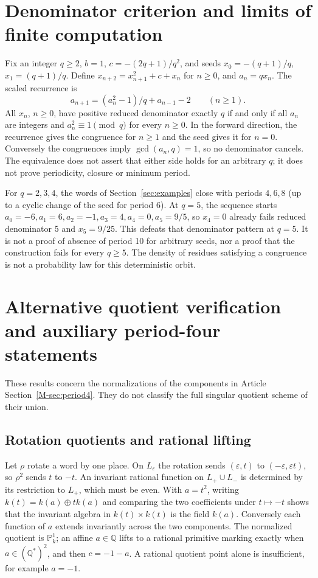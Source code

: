 \documentclass{jT}
\newcommand{\Q}{\mathbb Q}
\newcommand{\PP}{\mathbb P}
\begin{document}
\section{Denominator criterion and limits of finite computation}\label{app:denom}
Fix an integer $q\ge2$, $b=1$, $c=-(2q+1)/q^2$, and seeds $x_0=-(q+1)/q$, $x_1=(q+1)/q$. Define $x_{n+2}=x_{n+1}^2+c+x_n$ for $n\ge0$, and $a_n=qx_n$. The scaled recurrence is
\[
a_{n+1}=(a_n^2-1)/q+a_{n-1}-2\qquad(n\ge1).
\]
All $x_n$, $n\ge0$, have positive reduced denominator exactly $q$ if and only if all $a_n$ are integers and $a_n^2\equiv1\pmod q$ for every $n\ge0$. In the forward direction, the recurrence gives the congruence for $n\ge1$ and the seed gives it for $n=0$. Conversely the congruences imply $\gcd(a_n,q)=1$, so no denominator cancels. The equivalence does not assert that either side holds for an arbitrary $q$; it does not prove periodicity, closure or minimum period.

For $q=2,3,4$, the words of Section~\ref{sec:examples} close with periods $4,6,8$ (up to a cyclic change of the seed for period 6). At $q=5$, the sequence starts $a_0=-6,a_1=6,a_2=-1,a_3=4,a_4=0,a_5=9/5$, so $x_4=0$ already fails reduced denominator 5 and $x_5=9/25$. This defeats that denominator pattern at $q=5$. It is not a proof of absence of period 10 for arbitrary seeds, nor a proof that the construction fails for every $q\ge5$. The density of residues satisfying a congruence is not a probability law for this deterministic orbit.

\section{Alternative quotient verification and auxiliary period-four statements}\label{app:p4-aux}
These results concern the normalizations of the components in Article Section~\ref{M-sec:period4}. They do not classify the full singular quotient scheme of their union.

\subsection{Rotation quotients and rational lifting}
Let $\rho$ rotate a word by one place. On $L_\varepsilon$ the rotation sends $(\varepsilon,t)$ to $(-\varepsilon,\varepsilon t)$, so $\rho^2$ sends $t$ to $-t$. An invariant rational function on $L_+\cup L_-$ is determined by its restriction to $L_+$, which must be even. With $a=t^2$, writing $k(t)=k(a)\oplus t k(a)$ and comparing the two coefficients under $t\mapsto-t$ shows that the invariant algebra in $k(t)\times k(t)$ is the field $k(a)$. Conversely each function of $a$ extends invariantly across the two components. The normalized quotient is $\PP^1_k$; an affine $a\in\Q$ lifts to a rational primitive marking exactly when $a\in(\Q^*)^2$, and then $c=-1-a$. A rational quotient point alone is insufficient, for example $a=-1$.
\end{document}

